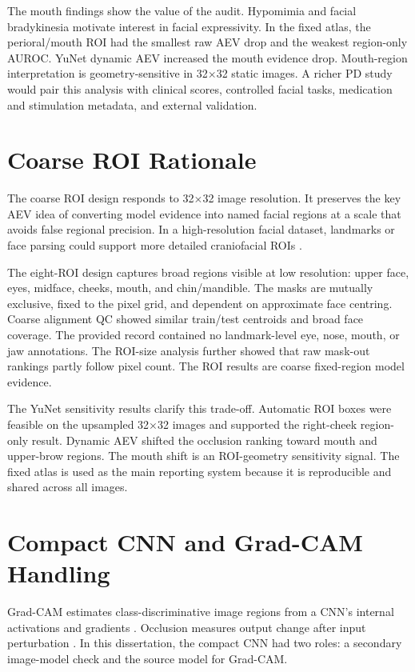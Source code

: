 The mouth findings show the value of the audit. Hypomimia and facial bradykinesia motivate interest in facial expressivity. In the fixed atlas, the perioral/mouth ROI had the smallest raw AEV drop and the weakest region-only AUROC. YuNet dynamic AEV increased the mouth evidence drop. Mouth-region interpretation is geometry-sensitive in 32$\times$32 static images. A richer PD study would pair this analysis with clinical scores, controlled facial tasks, medication and stimulation metadata, and external validation.


\section{Coarse ROI Rationale}

The coarse ROI design responds to 32$\times$32 image resolution. It preserves the key AEV idea of converting model evidence into named facial regions at a scale that avoids false regional precision. In a high-resolution facial dataset, landmarks or face parsing could support more detailed craniofacial ROIs  .


The eight-ROI design captures broad regions visible at low resolution: upper face, eyes, midface, cheeks, mouth, and chin/mandible. The masks are mutually exclusive, fixed to the pixel grid, and dependent on approximate face centring. Coarse alignment QC showed similar train/test centroids and broad face coverage. The provided record contained no landmark-level eye, nose, mouth, or jaw annotations. The ROI-size analysis further showed that raw mask-out rankings partly follow pixel count. The ROI results are coarse fixed-region model evidence.


The YuNet sensitivity results clarify this trade-off. Automatic ROI boxes were feasible on the upsampled 32$\times$32 images and supported the right-cheek region-only result. Dynamic AEV shifted the occlusion ranking toward mouth and upper-brow regions. The mouth shift is an ROI-geometry sensitivity signal. The fixed atlas is used as the main reporting system because it is reproducible and shared across all images.


\section{Compact CNN and Grad-CAM Handling}

Grad-CAM estimates class-discriminative image regions from a CNN's internal activations and gradients . Occlusion measures output change after input perturbation . In this dissertation, the compact CNN had two roles: a secondary image-model check and the source model for Grad-CAM.


